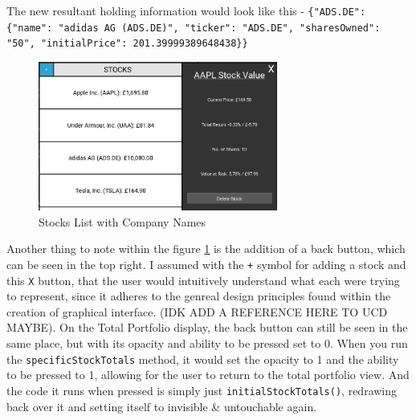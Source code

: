 \documentclass{article}
\begin{document}
The new resultant holding information would look like this - \texttt{\{"ADS.DE": \{"name": "adidas AG (ADS.DE)", "ticker": "ADS.DE", "sharesOwned": "50", "initialPrice": 201.39999389648438\}\}}\\\vspace{0.3cm}

\begin{figure}[h]
  \centering
  \includegraphics[width=0.7\textwidth]{Images/Term 2 Images/image (12).png}
  \caption{Stocks List with Company Names}
  \label{fig:Stock and Ticker Names}
\end{figure}

\vspace{0.3cm}
Another thing to note within the figure \ref{fig:Stock and Ticker Names} is the addition of a back button, which can be seen in the top right. I assumed with the \texttt{+} symbol for adding a stock and this \texttt{X} button, that the user would intuitively understand what each were trying to represent, since it adheres to the genreal design principles found within the creation of graphical interface. (IDK ADD A REFERENCE HERE TO UCD MAYBE). On the Total Portfolio display, the back button can still be seen in the same place, but with its opacity and ability to be pressed set to 0. When you run the \texttt{specificStockTotals} method, it would set the opacity to 1 and the ability to be pressed to 1, allowing for the user to return to the total portfolio view. And the code it runs when pressed is simply just \texttt{initialStockTotals()}, redrawing back over it and setting itself to invisible \& untouchable again.\\\vspace{0.3cm}
\end{document}
